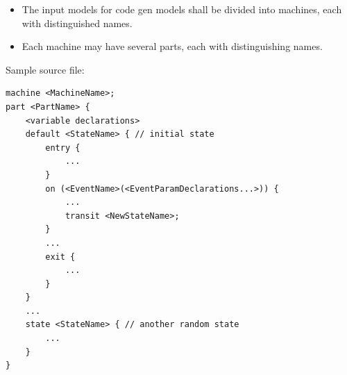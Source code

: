 \documentclass{article}
\begin{document}
\begin{itemize}
	\item The input models for code gen models shall be divided into machines, each with distinguished names.
	\item Each machine may have several parts, each with distinguishing names.
\end{itemize}
Sample source file:
\begin{lstlisting}
machine <MachineName>;
part <PartName> {
	<variable declarations>
	default <StateName> { // initial state
		entry {
			...
		}
		on (<EventName>(<EventParamDeclarations...>)) {
			...
			transit <NewStateName>;
		}
		...
		exit {
			...
		}
	}
	...
	state <StateName> { // another random state
		...
	}
}
\end{lstlisting}
\end{document}
